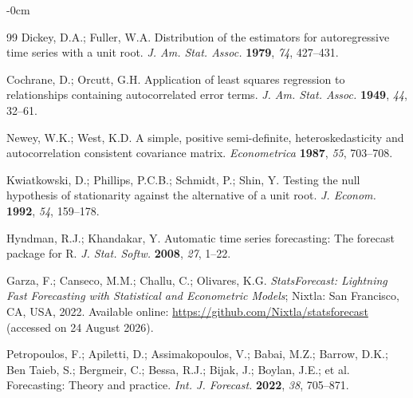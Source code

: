 \documentclass[forecasting,article,submit,pdftex,moreauthors]{Definitions/mdpi}
\begin{document}
\begin{adjustwidth}{-\extralength}{0cm}
\begin{thebibliography}{99}
Dickey, D.A.; Fuller, W.A. Distribution of the estimators for autoregressive time series with a unit root. \textit{J. Am. Stat. Assoc.} \textbf{1979}, \textit{74}, 427--431.

Cochrane, D.; Orcutt, G.H. Application of least squares regression to relationships containing autocorrelated error terms. \textit{J. Am. Stat. Assoc.} \textbf{1949}, \textit{44}, 32--61.

Newey, W.K.; West, K.D. A simple, positive semi-definite, heteroskedasticity and autocorrelation consistent covariance matrix. \textit{Econometrica} \textbf{1987}, \textit{55}, 703--708.

Kwiatkowski, D.; Phillips, P.C.B.; Schmidt, P.; Shin, Y. Testing the null hypothesis of stationarity against the alternative of a unit root. \textit{J. Econom.} \textbf{1992}, \textit{54}, 159--178.

Hyndman, R.J.; Khandakar, Y. Automatic time series forecasting: The forecast package for R. \textit{J. Stat. Softw.} \textbf{2008}, \textit{27}, 1--22.

Garza, F.; Canseco, M.M.; Challu, C.; Olivares, K.G. \textit{StatsForecast: Lightning Fast Forecasting with Statistical and Econometric Models}; Nixtla: San Francisco, CA, USA, 2022. Available online: \url{https://github.com/Nixtla/statsforecast} (accessed on 24 August 2026).

Petropoulos, F.; Apiletti, D.; Assimakopoulos, V.; Babai, M.Z.; Barrow, D.K.; Ben Taieb, S.; Bergmeir, C.; Bessa, R.J.; Bijak, J.; Boylan, J.E.; et al. Forecasting: Theory and practice. \textit{Int. J. Forecast.} \textbf{2022}, \textit{38}, 705--871.

\end{thebibliography}

%

\PublishersNote{}
\end{adjustwidth}
\end{document}
